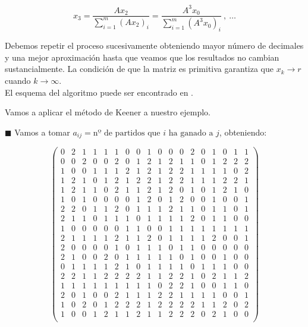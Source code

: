 \begin{equation*}
x_{3}=\dfrac{Ax_{2}}{\sum_{i=1}^{m}(Ax_{2})_{i}} = \dfrac{A^{3}x_{0}}{\sum_{i=1}^{m}(A^{3}x_{0})_{i}} \ , \ \dots
\end{equation*}

Debemos repetir el proceso sucesivamente obteniendo mayor número de decimales y una mejor aproximación hasta que veamos que los resultados no cambian sustancialmente. La condición de que la matriz es primitiva garantiza que $x_{k} \rightarrow r$ cuando $k \rightarrow \infty$.\\
El esquema del algoritmo puede ser encontrado en \cite{power_method}.

\begin{ejem} Vamos a aplicar el método de Keener a nuestro ejemplo.\\
\end{ejem}
	$\blacksquare $ Vamos a tomar $a_{ij} = \text{nº de partidos que } i \text{ ha ganado a } j $, obteniendo:
	
{\tiny 	\[
	\left(\begin{array}{cccccccccccccccccc}
	0 & 2 & 1 & 1 & 1 & 1 & 0 & 0 & 1 & 0 & 0 & 0 & 2 & 0 & 1 & 0 & 1 & 1\\
	0 & 0 & 2 & 0 & 0 & 2 & 0 & 1 & 2 & 1 & 2 & 1 & 1 & 0 & 1 & 2 & 2 & 2\\
	1 & 0 & 0 & 1 & 1 & 1 & 2 & 1 & 2 & 1 & 2 & 2 & 1 & 1 & 1 & 1 & 0 & 2\\
	1 & 2 & 1 & 0 & 1 & 2 & 1 & 2 & 2 & 1 & 2 & 2 & 1 & 1 & 1 & 2 & 2 & 1\\
	1 & 2 & 1 & 1 & 0 & 2 & 1 & 1 & 2 & 1 & 2 & 0 & 1 & 0 & 1 & 2 & 1 & 0\\
	1 & 0 & 1 & 0 & 0 & 0 & 0 & 1 & 2 & 0 & 1 & 2 & 0 & 0 & 1 & 0 & 0 & 1\\
	2 & 2 & 0 & 1 & 1 & 2 & 0 & 1 & 1 & 1 & 2 & 1 & 1 & 0 & 1 & 1 & 0 & 1\\
	2 & 1 & 1 & 0 & 1 & 1 & 1 & 0 & 1 & 1 & 1 & 1 & 2 & 0 & 1 & 1 & 0 & 0\\
	1 & 0 & 0 & 0 & 0 & 0 & 1 & 1 & 0 & 0 & 1 & 1 & 1 & 1 & 1 & 1 & 1 & 1\\
	2 & 1 & 1 & 1 & 1 & 2 & 1 & 1 & 2 & 0 & 1 & 1 & 1 & 1 & 2 & 0 & 0 & 1\\
	2 & 0 & 0 & 0 & 0 & 1 & 0 & 1 & 1 & 1 & 0 & 1 & 1 & 0 & 0 & 0 & 0 & 0\\
	2 & 1 & 0 & 0 & 2 & 0 & 1 & 1 & 1 & 1 & 1 & 0 & 1 & 0 & 0 & 1 & 0 & 0\\
	0 & 1 & 1 & 1 & 1 & 2 & 1 & 0 & 1 & 1 & 1 & 1 & 0 & 1 & 1 & 1 & 0 & 0\\
	2 & 2 & 1 & 1 & 2 & 2 & 2 & 2 & 1 & 1 & 2 & 2 & 1 & 0 & 2 & 1 & 1 & 2\\
	1 & 1 & 1 & 1 & 1 & 1 & 1 & 1 & 1 & 0 & 2 & 2 & 1 & 0 & 0 & 1 & 1 & 0\\
	2 & 0 & 1 & 0 & 0 & 2 & 1 & 1 & 1 & 2 & 2 & 1 & 1 & 1 & 1 & 0 & 0 & 1\\
	1 & 0 & 2 & 0 & 1 & 2 & 2 & 2 & 1 & 2 & 2 & 2 & 2 & 1 & 1 & 2 & 0 & 2\\
	1 & 0 & 0 & 1 & 2 & 1 & 1 & 2 & 1 & 1 & 2 & 2 & 2 & 0 & 2 & 1 & 0 & 0\\
	\end{array} \right) 
	\]}
	
